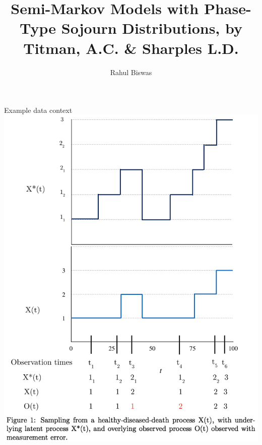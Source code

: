 \documentclass{beamer}
\date{}
\title{Semi-Markov Models with Phase-Type Sojourn Distributions, by Titman, A.C. \& Sharples L.D.}
\author{Rahul Biswas}
\institute{Department of Statistics, University of Washington, Seattle}
\begin{document}
\maketitle
\begin{frame}{Example data context}
\includegraphics[scale=0.41]{figprocessAndsampling5.png}
\hspace{3mm}

\end{frame}
\end{document}
